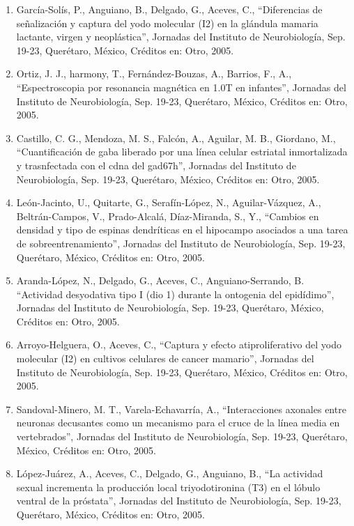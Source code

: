\begin{enumerate}
\item  García-Solís, P., Anguiano, B., Delgado, G., Aceves, C., “Diferencias de señalización y captura del yodo molecular 
(I2) 
en la glándula mamaria lactante, virgen y neoplástica”, Jornadas del Instituto de Neurobiología, Sep. 19-23, Querétaro, 
México, Créditos en: Otro, 2005.

\item  Ortiz, J. J., harmony, T., Fernández-Bouzas, A., Barrios, F., A., “Espectroscopia por resonancia magnética en 1.0T en 
infantes”, Jornadas del Instituto de Neurobiología, Sep. 19-23, Querétaro, México, Créditos en: Otro, 2005.

\item  Castillo, C. G., Mendoza, M. S., Falcón, A., Aguilar, M. B., Giordano, M., “Cuantificación de gaba liberado por una 
línea 
celular estriatal inmortalizada y trasnfectada con el cdna del gad67h”, Jornadas del Instituto de Neurobiología, Sep. 19-23, 
Querétaro, México, Créditos en: Otro, 2005.

\item  León-Jacinto, U., Quitarte, G., Serafín-López, N., Aguilar-Vázquez, A., Beltrán-Campos, V., Prado-Alcalá, 
Díaz-Miranda, 
S., Y., “Cambios en densidad y tipo de espinas dendríticas en el hipocampo asociados a una tarea de sobreentrenamiento”, 
Jornadas del Instituto de Neurobiología, Sep. 19-23, Querétaro, México, Créditos en: Otro, 2005.

\item  Aranda-López, N., Delgado, G., Aceves, C., Anguiano-Serrando, B. “Actividad desyodativa tipo I (dio 1) durante la 
ontogenia del epidídimo”, Jornadas del Instituto de Neurobiología, Sep. 19-23, Querétaro, México, Créditos en: Otro, 2005.

\item  Arroyo-Helguera, O., Aceves, C., “Captura y efecto atiproliferativo del yodo molecular (I2) en cultivos celulares de 
cancer mamario”, Jornadas del Instituto de Neurobiología, Sep. 19-23, Querétaro, México, Créditos en: Otro, 2005.

\item  Sandoval-Minero, M. T., Varela-Echavarría, A., “Interacciones axonales entre neuronas decusantes como un mecanismo 
para 
el cruce de la línea media en vertebrados”, Jornadas del Instituto de Neurobiología, Sep. 19-23, Querétaro, México, Créditos 
en: Otro, 2005.

\item  López-Juárez, A., Aceves, C., Delgado, G., Anguiano, B., “La actividad sexual incrementa la producción local 
triyodotironina (T3) en el lóbulo ventral de la próstata”, Jornadas del Instituto de
Neurobiología, Sep. 19-23, Querétaro, México, Créditos en: Otro, 2005.


\end{enumerate}
